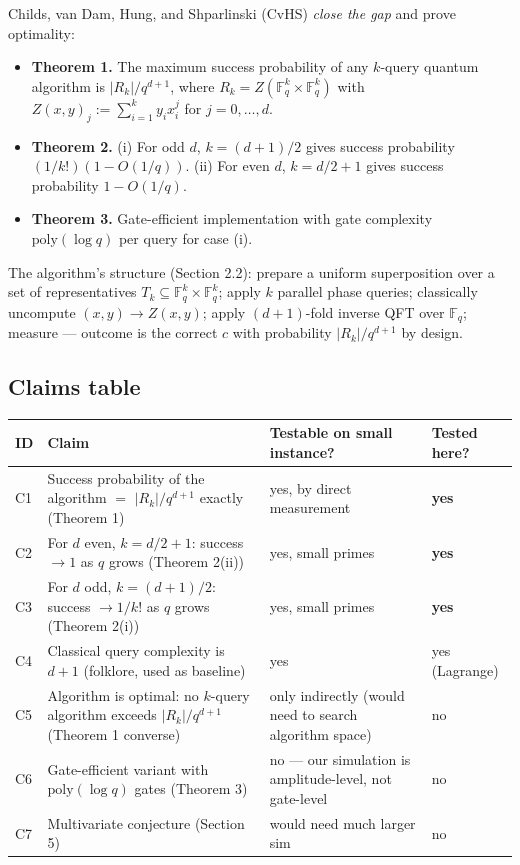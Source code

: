 \documentclass[11pt]{article}
\begin{document}
Childs, van Dam, Hung, and Shparlinski (CvHS) \emph{close the gap} and prove optimality:
\begin{itemize}
    \item \textbf{Theorem 1.}  The maximum success probability of any $k$-query quantum algorithm is
    $|R_k|/q^{d+1}$, where $R_k = Z(\mathbb{F}_q^k \times \mathbb{F}_q^k)$ with
    $Z(x,y)_j := \sum_{i=1}^k y_i x_i^j$ for $j = 0, \ldots, d$.
    \item \textbf{Theorem 2.}  (i) For odd $d$, $k = (d+1)/2$ gives success probability
    $(1/k!)(1 - O(1/q))$.  (ii) For even $d$, $k = d/2 + 1$ gives success probability $1 - O(1/q)$.
    \item \textbf{Theorem 3.}  Gate-efficient implementation with gate complexity $\mathrm{poly}(\log q)$
    per query for case (i).
\end{itemize}

The algorithm's structure (Section 2.2): prepare a uniform superposition over a set of
representatives $T_k \subseteq \mathbb{F}_q^k \times \mathbb{F}_q^k$; apply $k$ parallel phase
queries; classically uncompute $(x, y) \to Z(x, y)$; apply $(d+1)$-fold inverse QFT over
$\mathbb{F}_q$; measure — outcome is the correct $c$ with probability $|R_k|/q^{d+1}$ by design.

\subsection{Claims table}

\begin{center}\small
\begin{tabular}{lp{6.5cm}ll}
\toprule
ID & Claim & Testable on small instance? & Tested here? \\
\midrule
C1 & Success probability of the algorithm $=$ $|R_k|/q^{d+1}$ exactly (Theorem 1) & yes, by direct measurement & \textbf{yes} \\
C2 & For $d$ even, $k=d/2+1$: success $\to 1$ as $q$ grows (Theorem 2(ii)) & yes, small primes & \textbf{yes} \\
C3 & For $d$ odd, $k=(d+1)/2$: success $\to 1/k!$ as $q$ grows (Theorem 2(i)) & yes, small primes & \textbf{yes} \\
C4 & Classical query complexity is $d+1$ (folklore, used as baseline) & yes & yes (Lagrange) \\
C5 & Algorithm is optimal: no $k$-query algorithm exceeds $|R_k|/q^{d+1}$ (Theorem 1 converse) & only indirectly (would need to search algorithm space) & no \\
C6 & Gate-efficient variant with $\mathrm{poly}(\log q)$ gates (Theorem 3) & no --- our simulation is amplitude-level, not gate-level & no \\
C7 & Multivariate conjecture (Section 5) & would need much larger sim & no \\
\bottomrule
\end{tabular}
\end{center}
\end{document}
